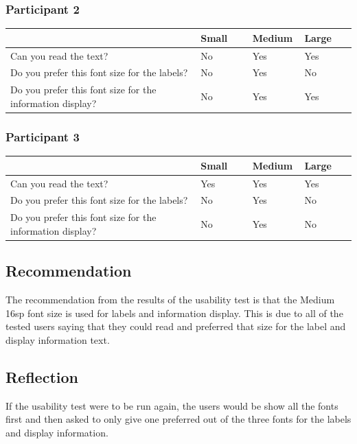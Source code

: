 \documentclass[11pt,english,numbers=endperiod,parskip=half]{scrartcl}
\begin{document}
\subsubsection{Participant 2}
\begin{table}[H]
	\begin{tabular}{| p{0.55\linewidth} | p{0.15\linewidth} | p{0.15\linewidth} | p{0.15 \linewidth} |}
		\hline
			&	Small	&	Medium	&	Large \\ \hline
		Can you read the text?	& No & Yes	& Yes \\ \hline
		Do you prefer this font size for the labels? & No & Yes & No \\ \hline
		Do you prefer this font size for the information display? & No & Yes & Yes \\
		\hline
	\end{tabular}
\end{table}

\subsubsection{Participant 3}
\begin{table}[H]
	\begin{tabular}{| p{0.55\linewidth} | p{0.15\linewidth} | p{0.15\linewidth} | p{0.15 \linewidth} |}
		\hline
			&	Small	&	Medium	&	Large \\ \hline
		Can you read the text?	& Yes	& Yes	& Yes \\ \hline
		Do you prefer this font size for the labels? & No & Yes & No \\ \hline
		Do you prefer this font size for the information display? & No & Yes & No \\
		\hline
	\end{tabular}
\end{table}

\subsection{Recommendation}
The recommendation from the results of the usability test is that the Medium 16sp font size is used for labels and information display. This is due to all of the tested users saying that they could read and preferred that size for the label and display information text.

\subsection{Reflection}
If the usability test were to be run again, the users would be show all the fonts first and then asked to only give one preferred out of the three fonts for the labels and display information.
\end{document}
